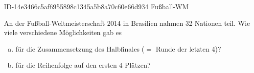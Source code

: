 \begin{exercise}
      {ID-14e3466c5af6955898c1345a5b8a70c60e66d934}
      {Fußball-WM}
  \ifproblem\problem\par
    An der Fußball-Weltmeisterschaft 2014 in Brasilien nahmen 32 Nationen
    teil. Wie viele verschiedene Möglichkeiten gab es
    \begin{enumerate}[a)]
      \item für die Zusammensetzung des Halbfinales ($=$ Runde der letzten 4)?
      \item für die Reihenfolge auf den ersten 4 Plätzen?
    \end{enumerate}
  \fi
\end{exercise}
